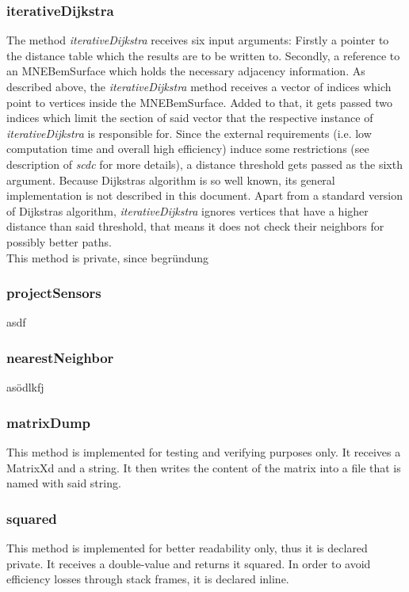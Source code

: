 \subsubsection{iterativeDijkstra}
The method \textit{iterativeDijkstra} receives six input arguments: Firstly a pointer to the distance table which the results are to be written to. Secondly, a reference to an MNEBemSurface which holds the necessary adjacency information. As described above, the \textit{iterativeDijkstra} method receives a vector of indices which point to vertices inside the MNEBemSurface. Added to that, it gets passed two indices which limit the section of said vector that the respective instance of \textit{iterativeDijkstra} is responsible for.
Since the external requirements (i.e. low computation time and overall high efficiency) induce some restrictions (see description of \textit{scdc} for more details), a distance threshold gets passed as the sixth argument. Because Dijkstras algorithm is so well known, its general implementation is not described in this document. Apart from a standard version of Dijkstras algorithm, \textit{iterativeDijkstra} ignores vertices that have a higher distance than said threshold, that means it does not check their neighbors for possibly better paths.\\
This method is private, since begründung

\subsubsection{projectSensors}
asdf

\subsubsection{nearestNeighbor}
asödlkfj

\subsubsection{matrixDump}
This method is implemented for testing and verifying purposes only. It receives a MatrixXd and a string. It then writes the content of the matrix into a file that is named with said string.

\subsubsection{squared}
This method is implemented for better readability only, thus it is declared private. It receives a double-value and returns it squared. In order to avoid efficiency losses through stack frames, it is declared inline.

